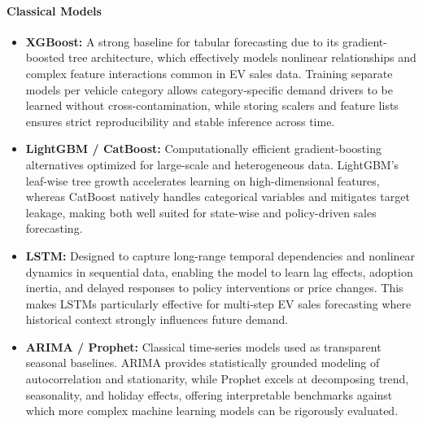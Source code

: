 \documentclass[pdflatex,sn-mathphys-num]{sn-jnl}%
\begin{document}
\paragraph{Classical Models}
\begin{itemize}
    \item \textbf{XGBoost:}  
    A strong baseline for tabular forecasting due to its gradient-boosted tree architecture, which effectively models nonlinear relationships and complex feature interactions common in EV sales data. Training separate models per vehicle category allows category-specific demand drivers to be learned without cross-contamination, while storing scalers and feature lists ensures strict reproducibility and stable inference across time.

    \item \textbf{LightGBM / CatBoost:}  
    Computationally efficient gradient-boosting alternatives optimized for large-scale and heterogeneous data. LightGBM’s leaf-wise tree growth accelerates learning on high-dimensional features, whereas CatBoost natively handles categorical variables and mitigates target leakage, making both well suited for state-wise and policy-driven sales forecasting.

    \item \textbf{LSTM:}  
    Designed to capture long-range temporal dependencies and nonlinear dynamics in sequential data, enabling the model to learn lag effects, adoption inertia, and delayed responses to policy interventions or price changes. This makes LSTMs particularly effective for multi-step EV sales forecasting where historical context strongly influences future demand.

    \item \textbf{ARIMA / Prophet:}  
    Classical time-series models used as transparent seasonal baselines. ARIMA provides statistically grounded modeling of autocorrelation and stationarity, while Prophet excels at decomposing trend, seasonality, and holiday effects, offering interpretable benchmarks against which more complex machine learning models can be rigorously evaluated.
\end{itemize}
\end{document}
